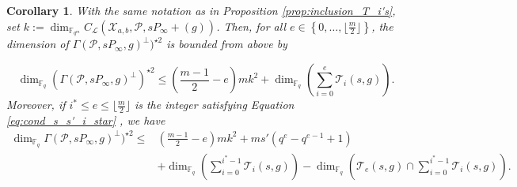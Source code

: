 \documentclass[a4paper]{amsart}
\newtheorem{coro}[thm]{Corollary}
\theoremstyle{definition}
\theoremstyle{remark}
\newcommand{\calP}{\mathcal{P}}
\newcommand{\calL}{\mathcal{L}}
\newcommand{\calT}{\mathcal{T}}
\newcommand{\calX}{\mathcal{X}}
\newcommand{\fqm}{\mathbb{F}_{q^m}}
\newcommand{\fq}{\mathbb{F}_{q}}
\newcommand{\set}[1]{\left\{#1\right\}}
\newcommand\mathieu[1]{\textcolor{brown}{#1}}
\begin{document}
\begin{coro} \label{coro:folklore_upper_bound}
 With the same notation as in Proposition \ref{prop:inclusion_T_i's}, set $k:=\dim_{\fqm}C_{\calL}(\calX_{a,b},\calP,sP_\infty+(g))$.
 Then, for all $e \in \set{0,\dots,\lfloor \frac{m}{2} \rfloor}$, the dimension of $\Gamma(\calP,sP_\infty,g)^{\perp})^{\star 2}$ is bounded from above by
 
\[\dim_{\fq} \left(\Gamma(\calP,sP_\infty,g)^{\perp}\right)^{\star 2} \leq   \left(\frac{m-1}{2}-e\right)mk^2+\dim_{\fq}\left(\sum\limits_{i=0}^e \calT_i(s,g) \right). \]
 Moreover, if $i^* \leq e \leq \lfloor \frac{m}{2} \rfloor$ is the integer satisfying Equation \eqref{eq:cond_s_s'_i_star} , we have 
 \begin{align*}
  \dim_{\fq} \Gamma(\calP,sP_\infty,g)^{\perp})^{\star 2} \leq   & \left(\frac{m-1}{2}-e\right)mk^2 + ms'(q^e-q^{e-1}+1) \\
  & + \dim_{\fq}\left(\sum\limits_{i=0}^{i^*-1} \calT_i(s,g)\right) - \dim_{\fq} \left( \calT_e(s,g) \cap   \sum\limits_{i=0}^{i^*-1} \calT_i(s,g)\right).
 \end{align*}

\end{coro}
%
\end{document}
